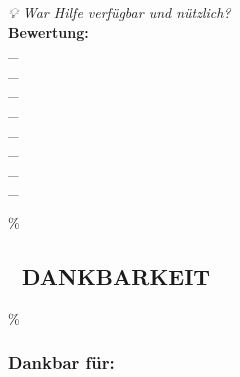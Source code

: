 \emph{💡 War Hilfe verfügbar und nützlich?}\\
\textbf{Bewertung:} \\_\\_\\_\\_\\_\\_\\_\\_

\hypertarget{dankbarkeit}{\%
\subsection{\texorpdfstring{\textbf{💝 DANKBARKEIT}}{💝 DANKBARKEIT}}\label{dankbarkeit}}

\hypertarget{dankbar-fuxfcr}{\%
\subsubsection{\texorpdfstring{\textbf{Dankbar für:}}{Dankbar für:}}\label{dankbar-fuxfcr}}

